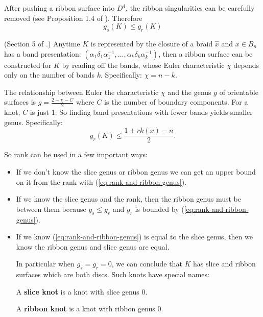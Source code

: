 \documentclass[12pt]{thesis}
\begin{document}
After pushing a ribbon surface into $D^{4}$,
the ribbon singularities can be carefully removed (see Proposition 1.4 of \cite{rudolph-braided-surfaces}).
Therefore 
\begin{equation}
    \label{eq:slice-and-ribbon-genus}
    g_{s}(K) \leq g_{r}(K)
\end{equation}

\begin{proposition} (Section 5 of \cite{rudolph-braided-surfaces}.)
    Anytime $K$ is represented by the closure of a braid $\widehat{x}$ 
    and $x \in B_{n}$ has a band presentation: $(\alpha_{1} \delta_{1} \alpha_{1}^{-1}, \ldots, \alpha_{k} \delta_{k} \alpha_{k}^{-1})$,
    then a ribbon surface can be constructed for $K$ by reading off the bands,
    whose Euler characteristic $\chi$ depends only
    on the number of bands $k$.
    Specifically: $\chi = n - k$. 
\end{proposition}

The relationship between Euler the characteristic $\chi$
and the genus $g$ of orientable surfaces is $g = \frac{2 - \chi - C}{2}$ where $C$ is the number
of boundary components. For a knot, $C$ is just $1$.
So finding band presentations with fewer bands yields smaller genus.
Specifically: 
\begin{equation}
    \label{eq:rank-and-ribbon-genus}
    g_{r}(K) \leq \frac{1 + rk(x) - n}{2}.
\end{equation}

So rank can be used in a few important ways:
\begin{itemize}
    \item If we don't know the slice genus or ribbon genus
          we can get an upper bound on it from the rank
          with (\ref{eq:rank-and-ribbon-genus}).

    \item If we know the slice genus and the rank,
          then the ribbon genus must be between them
          because $g_{s} \leq g_{r}$ and $g_{r}$
          is bounded by (\ref{eq:rank-and-ribbon-genus}).

      \item If we know (\ref{eq:rank-and-ribbon-genus}) 
          is equal to the slice genus,
          then we know the ribbon genus and slice genus are equal.

          In particular when $g_{s} = g_{r} = 0$,
          we can conclude that $K$ has slice
          and ribbon surfaces which are both discs.
          Such knots have special names:

          \begin{definition}
              A \textbf{slice knot} is a knot with slice genus 0.
          \end{definition}
          \begin{definition}
              A \textbf{ribbon knot} is a knot with ribbon genus 0.
          \end{definition}
\end{itemize}
\end{document}
